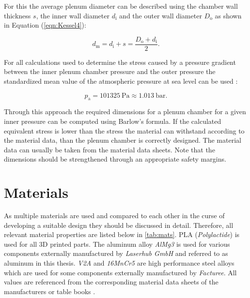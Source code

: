 For this the average plenum diameter can be described  using the chamber wall thickness $s$, the inner wall diameter $d_\text{i}$ and the outer wall diameter $D_\text{o}$ as shown in Equation (\ref{eqn:Kessel4}):

\begin{equation}
d_\text{m} = d_\text{i} + s = \frac{D_\text{o} + d_\text{i}}{2} .
\label{eqn:Kessel4}
\end{equation}

For all calculations used to determine the stress caused by a pressure gradient between the inner plenum chamber pressure and the outer pressure the standardized mean value of the atmospheric pressure at sea level can be used \cite{DeutschesInsitutfurNormunge.V.DIN.}:

\begin{equation}
p_\text{a} = 101325 \ \text{Pa} \approx 1.013 \ \text{bar} .
\label{eqn:Kessel6}
\end{equation}

Through this approach the required dimensions for a plenum chamber for a given inner pressure can be computed using Barlow's formula. If the calculated equivalent stress is lower than the stress the material can withstand according to the material data, than the plenum chamber is correctly designed. The material data can usually be taken from the material data sheets. Note that the dimensions should be strengthened through an appropriate safety margins.



\section{Materials}
As multiple materials are used and compared to each other in the curse of developing a suitable design they should be discussed in detail. Therefore, all relevant material properties are listed below in \autoref{tab:mats}. PLA (\textit{Polylactide}) is used for all 3D printed parts. The aluminum alloy \textit{AlMg3} is used for various components externally manufactured by \textit{Laserhub GmbH} and referred to as aluminum in this thesis. \textit{V2A} and \textit{16MnCr5} are high performance steel alloys which are used for some components externally manufactured by \textit{Facturee}. All values are referenced from the corresponding material data sheets of the manufacturers or table books \cite{Gomeringer.2014}.


